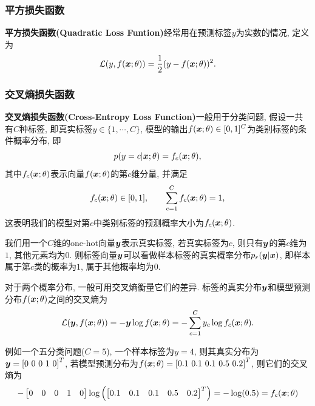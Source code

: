 \documentclass[12pt, a4paper, oneside]{ctexart}
\begin{document}
\subsubsection{平方损失函数}
\textbf{平方损失函数(Quadratic Loss Funtion)}经常用在预测标签$y$为实数的情况, 定义为
\begin{equation}
    \mathcal{L}(y, f(\boldsymbol{x}; \theta)) = \frac{1}{2}(y - f(\boldsymbol{x};\theta))^2.
\end{equation}
\subsubsection{交叉熵损失函数}
\textbf{交叉熵损失函数(Cross-Entropy Loss Function)}一般用于分类问题, 假设一共有$C$种标签, 即真实标签$y\in\{1,\cdots,C\}$, 模型的输出$f(\boldsymbol{x};\theta)\in[0,1]^C$为类别标签的条件概率分布, 即
\begin{equation}
    p(y=c|\boldsymbol{x};\theta) = f_c(\boldsymbol{x};\theta),
\end{equation}
其中$f_c(\boldsymbol{x};\theta)$表示向量$f(\boldsymbol{x};\theta)$的第$c$维分量, 并满足
\begin{equation}
    f_c(\boldsymbol{x};\theta)\in[0, 1],\qquad \sum_{c=1}^Cf_c(\boldsymbol{x};\theta) = 1,
\end{equation}
这表明我们的模型对第$c$中类别标签的预测概率大小为$f_c(\boldsymbol{x};\theta)$.

我们用一个$C$维的one-hot向量$\boldsymbol{y}$表示真实标签, 若真实标签为$c$, 则只有$\boldsymbol{y}$的第$c$维为$1$, 其他元素均为$0$. 则标签向量$\boldsymbol{y}$可以看做样本标签的真实概率分布$p_r(\boldsymbol{y}|\boldsymbol{x})$, 即样本属于第$c$类的概率为$1$, 属于其他概率均为$0$.

对于两个概率分布, 一般可用交叉熵衡量它们的差异. 标签的真实分布$\boldsymbol{y}$和模型预测分布$f(\boldsymbol{x};\theta)$之间的交叉熵为
\begin{equation}\label{cross-entropy}
    \mathcal{L}(\boldsymbol{y}, f(\boldsymbol{x};\theta)) = -\boldsymbol{y}\log f(\boldsymbol{x};\theta) = -\sum_{c = 1}^Cy_c\log f_c(\boldsymbol{x};\theta).
\end{equation}

例如一个五分类问题($C=5$), 一个样本标签为$y=4$, 则其真实分布为$\bd{y} = \left[0\ 0\ 0\ 1\ 0\right]^T$, 若模型预测分布为$f(\bd{x};\theta) = \left[0.1\ 0.1\ 0.1\ 0.5\ 0.2\right]^T$, 则它们的交叉熵为
\begin{equation}
    -\left[\begin{matrix}
        0&0&0&1&0
    \end{matrix}\right]\log\left(\left[\begin{matrix}
        0.1&0.1&0.1&0.5&0.2
    \end{matrix}\right]^T\right) = -\log(0.5) = f_c(\boldsymbol{x};\theta)
\end{equation}
\end{document}
